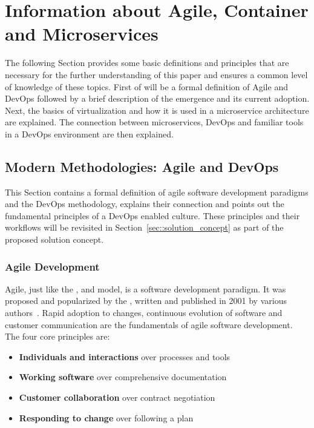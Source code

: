 \documentclass[12pt, a4paper]{article}
\begin{document}
\section{Information about Agile, Container and Microservices}\label{sec::backgrund}
The following Section provides some basic definitions and principles that are necessary for the further understanding of this paper and ensures a common level of knowledge of these topics. First of will be a formal definition of Agile and DevOps followed by a brief description of the emergence and its current adoption. Next, the basics of virtualization and how it is used in a microservice architecture are explained. The connection between microservices, DevOps and familiar tools in a DevOps environment are then explained.

    \subsection{Modern Methodologies: Agile and DevOps}\label{ssec::devops}
    This Section contains a formal definition of agile software development paradigms and the DevOps methodology, explains their connection and points out the fundamental principles of a DevOps enabled culture. These principles and their workflows will be revisited in Section~\ref{sec::solution_concept} as part of the proposed solution concept.

        \subsubsection{Agile Development}
        Agile, just like the ,  and  model, is a software development paradigm. It was proposed and popularized by the , written and published in 2001 by various authors~\cite{manifesto}. Rapid adoption to changes, continuous evolution of software and customer communication are the fundamentals of agile software development.\newline
        The four core principles are:

        \begin{itemize}[label=\(\star\)]
            \setlength\itemsep{0em}
            \item \textbf{Individuals and interactions} over processes and tools
            \item \textbf{Working software} over comprehensive documentation
            \item \textbf{Customer collaboration} over contract negotiation
            \item \textbf{Responding to change} over following a plan
        \end{itemize}
\end{document}
